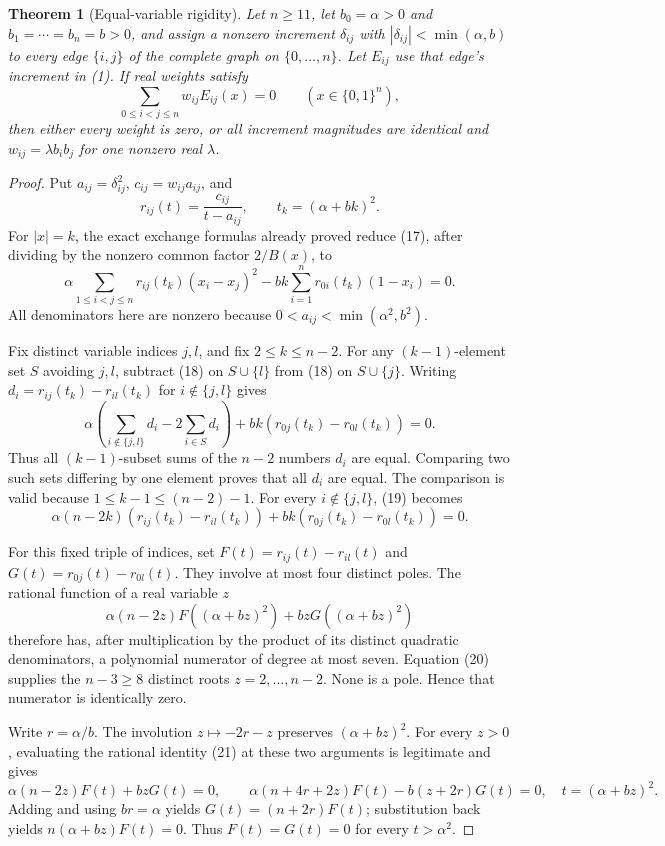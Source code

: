 \documentclass[11pt]{article}
\newtheorem{theorem}{Theorem}
\begin{document}
\begin{theorem}[Equal-variable rigidity]
Let $n\ge11$, let $b_0=\alpha>0$ and $b_1=\cdots=b_n=b>0$,
and assign a nonzero
increment $\delta_{ij}$ with $|\delta_{ij}|<\min(\alpha,b)$ to every edge
$\{i,j\}$ of the complete graph on $\{0,\ldots,n\}$. Let
$E_{ij}$ use that edge's increment in (1). If real weights satisfy
\[
                   \sum_{0\le i<j\le n}w_{ij}E_{ij}(x)=0
                   \qquad(x\in\{0,1\}^n),
 \tag{17}
\]
then either every weight is zero, or all increment magnitudes are
identical and $w_{ij}=\lambda b_i b_j$ for one nonzero real $\lambda$.
\end{theorem}
\begin{proof}
Put $a_{ij}=\delta_{ij}^2$, $c_{ij}=w_{ij}a_{ij}$, and
\[
 r_{ij}(t)=\frac{c_{ij}}{t-a_{ij}},\qquad t_k=(\alpha+bk)^2.
\]
For $|x|=k$, the exact exchange formulas already proved reduce (17),
after dividing by the nonzero common factor $2/B(x)$, to
\[
 \alpha\sum_{1\le i<j\le n}r_{ij}(t_k)(x_i-x_j)^2
       -bk\sum_{i=1}^n r_{0i}(t_k)(1-x_i)=0.
 \tag{18}
\]
All denominators here are nonzero because
$0<a_{ij}<\min(\alpha^2,b^2)$.

Fix distinct variable indices $j,l$, and fix $2\le k\le n-2$.
For any $(k-1)$-element set $S$ avoiding $j,l$, subtract (18) on
$S\cup\{l\}$ from (18) on $S\cup\{j\}$. Writing
$d_i=r_{ij}(t_k)-r_{il}(t_k)$ for $i\notin\{j,l\}$ gives
\[
 \alpha\left(\sum_{i\notin\{j,l\}}d_i-2\sum_{i\in S}d_i\right)
                  +bk(r_{0j}(t_k)-r_{0l}(t_k))=0.
 \tag{19}
\]
Thus all $(k-1)$-subset sums of the $n-2$ numbers $d_i$ are equal.
Comparing two such sets differing by one element proves that all
$d_i$ are equal. The comparison is valid because
$1\le k-1\le(n-2)-1$. For every $i\notin\{j,l\}$, (19) becomes
\[
 \alpha(n-2k)(r_{ij}(t_k)-r_{il}(t_k))
           +bk(r_{0j}(t_k)-r_{0l}(t_k))=0.
 \tag{20}
\]

For this fixed triple of indices, set
$F(t)=r_{ij}(t)-r_{il}(t)$ and
$G(t)=r_{0j}(t)-r_{0l}(t)$. They involve at most four distinct
poles. The rational function of a real variable $z$
\[
       \alpha(n-2z)F((\alpha+bz)^2)+bzG((\alpha+bz)^2)
 \tag{21}
\]
therefore has, after multiplication by the product of its distinct
quadratic denominators, a polynomial numerator of degree at most seven.
Equation (20) supplies the $n-3\ge8$ distinct roots
$z=2,\ldots,n-2$. None is a pole. Hence that numerator is identically
zero.

Write $r=\alpha/b$. The involution $z\mapsto-2r-z$
preserves $(\alpha+bz)^2$. For every $z>0$, evaluating the rational
identity (21) at these two arguments is legitimate and gives
\[
 \alpha(n-2z)F(t)+bzG(t)=0,\qquad
 \alpha(n+4r+2z)F(t)-b(z+2r)G(t)=0,
 \quad t=(\alpha+bz)^2.
 \tag{22}
\]
Adding and using $br=\alpha$ yields $G(t)=(n+2r)F(t)$;
substitution back yields $n(\alpha+bz)F(t)=0$.
Thus $F(t)=G(t)=0$ for every $t>\alpha^2$.


\end{proof}
\end{document}
